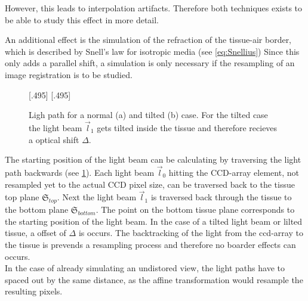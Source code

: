 However, this leads to interpolation artifacts.
Therefore both techniques exists to be able to study this effect in more detail.
\par
%
An additional effect is the simulation of the refraction of the tissue-air border, which is described by Snell's law for isotropic media (see \cref{eq:Snellius})
Since this only adds a parallel shift, a simulation is only necessary if the resampling of an image registration is to be studied.
\par
%
\begin{figure}[!t]
\setlength{\tikzwidth}{0.42\textwidth}
[.495\textwidth]{
\def\tilt{0}
\def\nindex{2.25}
}\hfill
{}[.495\textwidth]{
}
\caption[Light path]{Ligh path for a normal (a) and tilted (b) case. For the tilted case the light beam $\vec{l}_1$ gets tilted inside the tissue and therefore recieves a optical shift $\Delta$.}
\label{fig:tilted_side_view}
\end{figure}
%
The starting position of the light beam can be calculating by traversing the light path backwards (see \cref{fig:tilted_side_view}).
Each light beam $\vec{l}_0$ hitting the \ac{CCD}-array element, not resampled yet to the actual \ac{CCD} pixel size, can be traversed back to the tissue top plane $\mathfrak{S}_{top}$.
Next the light beam $\vec{l}_1$ is traversed back through the tissue to the bottom plane $\mathfrak{S}_{bottom}$.
The point on the bottom tissue plane corresponds to the starting position of the light beam.
In the case of a tilted light beam or lilted tissue, a offset of $\Delta$ is occurs.
The backtracking of the light from the ccd-array to the tissue is prevends a  resampling process and therefore no boarder effects can occurs.
\\
%
In the case of already simulating an undistored view, the light paths have to spaced out by the same distance, as the affine transformation would resample the resulting pixels.
%
\begin{lstfloat}[!p]
	
	\caption{Pseudocode simulation }
	\label{alg:simulation}
\end{lstfloat}
%
